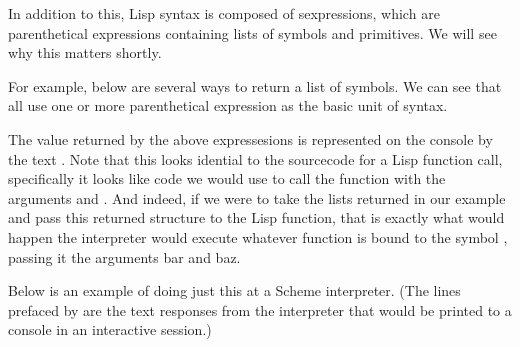 \documentclass[letterpaper,10pt,english]{sphinxmanual}
\begin{document}
\sphinxAtStartPar
In addition to this, Lisp syntax is  composed of s\sphinxhyphen{}expressions, which are parenthetical
expressions containing lists of symbols and primitives. We will see why this matters shortly.

\sphinxAtStartPar
For example, below are several ways to return a list of symbols. We can see that all
use one or more parenthetical expression as the basic unit of syntax.

\begin{sphinxVerbatim}[commandchars=\\\{\}]
\end{sphinxVerbatim}

\sphinxAtStartPar
The value returned by the above expressesions is represented on the console by the text .
Note that this looks idential to the source\sphinxhyphen{}code for a Lisp function call,
specifically it looks like code we would use to call the function  with the arguments  and .
And indeed, if we were to take the lists returned in our example and pass this returned  structure
to the Lisp  function,
that is exactly what would happen \sphinxhyphen{} the interpreter would execute whatever function is bound to the symbol , passing
it the arguments bar and baz.

\sphinxAtStartPar
Below is an example of doing just this at a Scheme interpreter. (The lines prefaced by \sphinxstylestrong{\textgreater{}} are the text
responses from the interpreter that would be printed to a console in an interactive session.)
\end{document}
